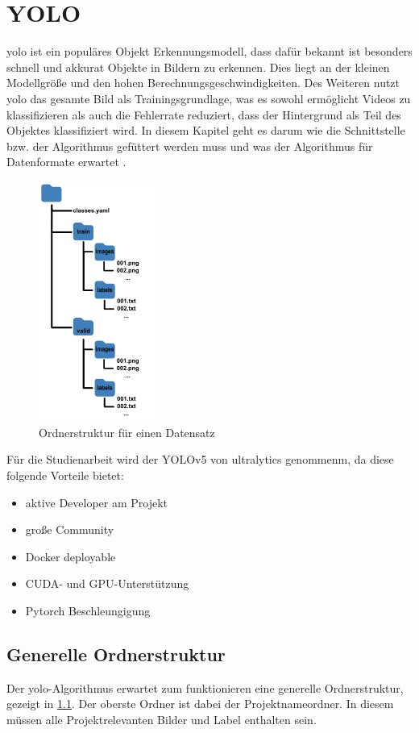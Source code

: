 \chapter{YOLO}
\label{sec:yolo}
\ac{yolo} ist ein populäres Objekt Erkennungsmodell, dass dafür bekannt ist besonders schnell und akkurat Objekte in Bildern zu erkennen. Dies liegt an der kleinen Modellgröße und den hohen Berechnungsgeschwindigkeiten. Des Weiteren nutzt \ac{yolo} das gesamte Bild als Trainingsgrundlage, was es sowohl ermöglicht Videos zu klassifizieren als auch die Fehlerrate reduziert, dass der Hintergrund als Teil des Objektes klassifiziert wird. In diesem Kapitel geht es darum wie die Schnittstelle bzw. der Algorithmus gefüttert werden muss und was der Algorithmus für Datenformate erwartet \cite{Jiang.2022}.

\begin{figure}
    \includegraphics[width=4cm]{data/img/ordnerstruktur_yolo.png}
    \caption{Ordnerstruktur für einen Datensatz}
    \label{fig:folderYolo}
\end{figure}

Für die Studienarbeit wird der YOLOv5 von ultralytics \cite{glennjocher.2023} genommenm, da diese folgende Vorteile bietet:
\begin{itemize}
    \item aktive Developer am Projekt
    \item große Community 
    \item Docker deployable
    \item CUDA- und GPU-Unterstützung
    \item Pytorch Beschleungigung
\end{itemize}


\section{Generelle Ordnerstruktur}
Der \ac{yolo}-Algorithmus erwartet zum funktionieren eine generelle Ordnerstruktur, gezeigt in \ref{fig:folderYolo}. Der oberste Ordner ist dabei der Projektnameordner. In diesem müssen alle Projektrelevanten Bilder und Label enthalten sein. 

